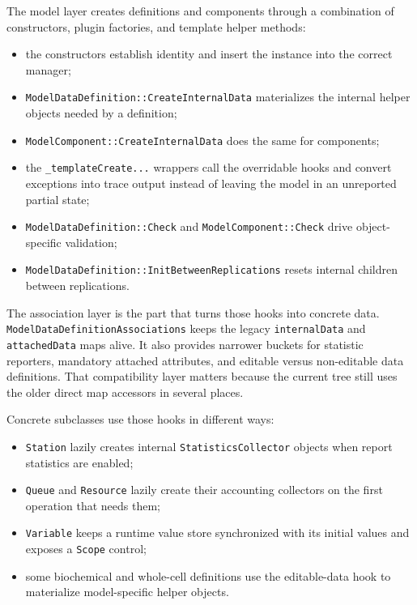 The model layer creates definitions and components through a combination of
constructors, plugin factories, and template helper methods:
\begin{itemize}
\item the constructors establish identity and insert the instance into the
      correct manager;
\item \texttt{ModelDataDefinition::CreateInternalData} materializes the
      internal helper objects needed by a definition;
\item \texttt{ModelComponent::CreateInternalData} does the same for
      components;
\item the \texttt{\_templateCreate...} wrappers call the overridable hooks and convert
      exceptions into trace output instead of leaving the model in an
      unreported partial state;
\item \texttt{ModelDataDefinition::Check} and \texttt{ModelComponent::Check} drive
      object-specific validation;
\item \texttt{ModelDataDefinition::InitBetweenReplications} resets internal children
      between replications.
\end{itemize}

The association layer is the part that turns those hooks into concrete data.
\texttt{ModelDataDefinitionAssociations} keeps the legacy \texttt{internalData}
and \texttt{attachedData} maps alive. It also provides narrower buckets for
statistic reporters, mandatory attached attributes, and editable versus
non-editable data definitions. That compatibility layer matters because the
current tree still uses the older direct map accessors in several places.

Concrete subclasses use those hooks in different ways:
\begin{itemize}
\item \texttt{Station} lazily creates internal \texttt{StatisticsCollector} objects when
      report statistics are enabled;
\item \texttt{Queue} and \texttt{Resource} lazily create their accounting collectors on the
      first operation that needs them;
\item \texttt{Variable} keeps a runtime value store synchronized with its initial
      values and exposes a \texttt{Scope} control;
\item some biochemical and whole-cell definitions use the editable-data hook
      to materialize model-specific helper objects.
\end{itemize}

